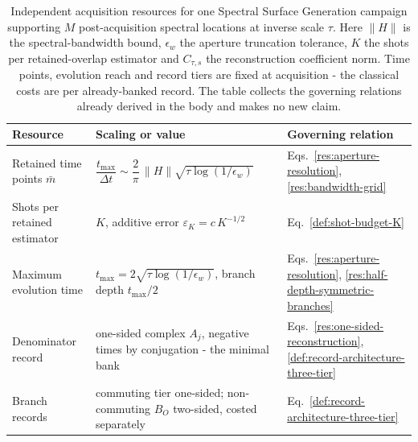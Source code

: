 \begin{table}[tb]
\caption{Independent acquisition resources for one Spectral Surface Generation campaign supporting $M$ post-acquisition spectral locations at inverse scale $\tau$. Here $\|H\|$ is the spectral-bandwidth bound, $\epsilon_w$ the aperture truncation tolerance, $K$ the shots per retained-overlap estimator and $C_{\tau,s}$ the reconstruction coefficient norm. Time points, evolution reach and record tiers are fixed at acquisition - the classical costs are per already-banked record. The table collects the governing relations already derived in the body and makes no new claim.}
\label{tab:resource}
\begin{ruledtabular}
\begin{tabular}{lll}
\textbf{Resource} & \textbf{Scaling or value} & \textbf{Governing relation} \\ \hline
\parbox[t]{0.22\textwidth}{\raggedright Retained time points $\bar m$\strut} & $\dfrac{t_{\max}}{\Delta t}\sim\dfrac{2}{\pi}\,\|H\|\sqrt{\tau\log(1/\epsilon_w)}$ & Eqs.~\eqref{res:aperture-resolution}, \eqref{res:bandwidth-grid} \\[6pt]
\parbox[t]{0.22\textwidth}{\raggedright Shots per retained estimator\strut} & $K$, additive error $\varepsilon_K=c\,K^{-1/2}$ & Eq.~\eqref{def:shot-budget-K} \\[6pt]
\parbox[t]{0.22\textwidth}{\raggedright Maximum evolution time\strut} & $t_{\max}=2\sqrt{\tau\log(1/\epsilon_w)}$, branch depth $t_{\max}/2$ & Eqs.~\eqref{res:aperture-resolution}, \eqref{res:half-depth-symmetric-branches} \\[6pt]
\parbox[t]{0.22\textwidth}{\raggedright Denominator record\strut} & \parbox[t]{0.40\textwidth}{\raggedright one-sided complex $A_j$, negative times by conjugation - the minimal bank\strut} & Eqs.~\eqref{res:one-sided-reconstruction}, \eqref{def:record-architecture-three-tier} \\[6pt]
\parbox[t]{0.22\textwidth}{\raggedright Branch records\strut} & \parbox[t]{0.40\textwidth}{\raggedright commuting tier one-sided; non-commuting $B_O$ two-sided, costed separately\strut} & Eq.~\eqref{def:record-architecture-three-tier} \\[6pt]

\end{tabular}
\end{ruledtabular}
\end{table}
